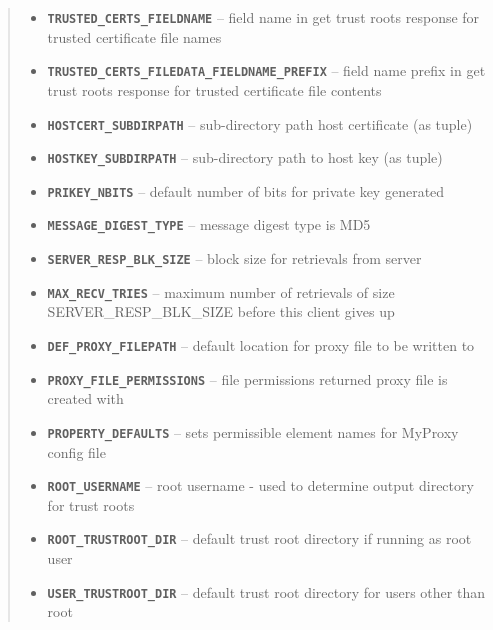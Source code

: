 \documentclass[letterpaper,10pt,english]{sphinxmanual}
\begin{document}
\begin{fulllineitems}
\begin{quote}
\begin{description}
\begin{itemize}
\item {} 
\textbf{\texttt{TRUSTED\_CERTS\_FIELDNAME}} -- field name in get trust roots response     for trusted certificate file names

\item {} 
\textbf{\texttt{TRUSTED\_CERTS\_FILEDATA\_FIELDNAME\_PREFIX}} -- field name prefix in get trust roots response for trusted certificate file contents

\item {} 
\textbf{\texttt{HOSTCERT\_SUBDIRPATH}} -- sub-directory path host certificate (as tuple)

\item {} 
\textbf{\texttt{HOSTKEY\_SUBDIRPATH}} -- sub-directory path to host key (as tuple)

\item {} 
\textbf{\texttt{PRIKEY\_NBITS}} -- default number of bits for private key generated

\item {} 
\textbf{\texttt{MESSAGE\_DIGEST\_TYPE}} -- message digest type is MD5

\item {} 
\textbf{\texttt{SERVER\_RESP\_BLK\_SIZE}} -- block size for retrievals from server

\item {} 
\textbf{\texttt{MAX\_RECV\_TRIES}} -- maximum number of retrievals of size SERVER\_RESP\_BLK\_SIZE before this client gives up

\item {} 
\textbf{\texttt{DEF\_PROXY\_FILEPATH}} -- default location for proxy file to be written to

\item {} 
\textbf{\texttt{PROXY\_FILE\_PERMISSIONS}} -- file permissions returned proxy file is created with

\item {} 
\textbf{\texttt{PROPERTY\_DEFAULTS}} -- sets permissible element names for MyProxy config     file

\item {} 
\textbf{\texttt{ROOT\_USERNAME}} -- root username - used to determine output directory     for trust roots

\item {} 
\textbf{\texttt{ROOT\_TRUSTROOT\_DIR}} -- default trust root directory if running as root user

\item {} 
\textbf{\texttt{USER\_TRUSTROOT\_DIR}} -- default trust root directory for users other than root


\end{itemize}
\end{description}
\end{quote}
\end{fulllineitems}
\end{document}

